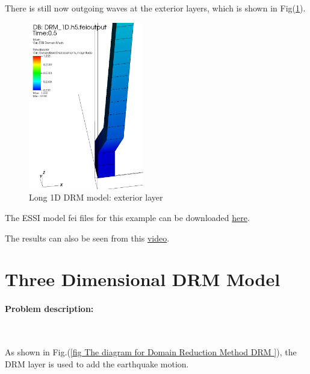 \documentclass[fleqn,11pt]{article}
\begin{document}
There is still now outgoing waves at the exterior layers, which is shown in Fig(\ref{fig_Long 1D DRM model_exterior_layer}).
\begin{figure}[H]
  \centering
  \includegraphics[width=5cm]{../Figure-files/long_DRM_part.png}
  \caption{Long 1D DRM model: exterior layer}
  \label{fig_Long 1D DRM model_exterior_layer}
\end{figure}


The ESSI model fei files for this example can be downloaded \href{https://github.com/BorisJeremic/Real-ESSI-Examples/blob/master/model_fei_file/8NodeBrick_DRM_1D_long/8NodeBrick_DRM_1D_long.tgz?raw=true}{here}.

The results can also be seen from this \href{http://sokocalo.engr.ucdavis.edu/~jeremic/lecture_notes_online_material/_Chapter_Applications_Earthquake_Soil_Structure_Interaction_General_Aspects/Animation_DRM_1D.mp4}{video}.















\vskip 20pt
\section{Three Dimensional DRM Model}

\paragraph{Problem description:} ~

As shown in Fig.(\ref{fig The diagram for Domain Reduction Method DRM }), the DRM layer is used to add the earthquake motion. 
\end{document}
